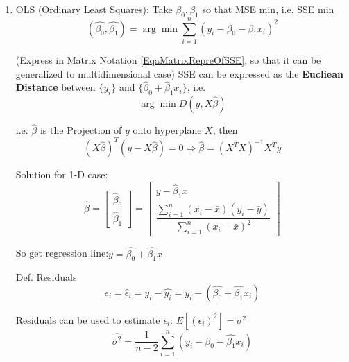    \begin{enumerate}
        \item OLS (Ordinary Least Squares): Take $\beta_0,\beta_1$ so that MSE min, i.e. SSE min
        \begin{equation}
            (\hat{\beta_0},\hat{\beta_1})=\arg\min\sum_{i=1}^n(y_i-\beta_0-\beta_1 x_i)^2    
        \end{equation}

        (Express in Matrix Notation \autoref{EqaMatrixRepreOfSSE}, so that it can be generalized to multidimensional case) SSE can be expressed as the \textbf{Eucliean Distance }between $ \{y_i\} $ and $ \{\hat{\beta}_0+\hat{\beta}_1x_i\}  $, i.e.
        \begin{equation}
            \arg\min D(y
            ,X \hat{\beta})
        \end{equation}

         i.e. $ \hat{\beta} $ is the Projection of $y $ onto hyperplane $ X $, then
         \begin{equation}
            ( X\hat{\beta} )^T(y- X\hat{\beta})=0 \Rightarrow \hat{\beta}=(X^TX)^{-1}X^Ty 
         \end{equation}
        

        Solution for 1-D case:
        \begin{equation}
            \hat{\beta}=\begin{bmatrix}
                \hat{\beta}_0\\ \hat{\beta}_1
            \end{bmatrix}
            =
            \begin{bmatrix}
            \bar{y}- \hat{\beta}_1\bar{x}\\
            \dfrac{\sum\limits_{i=1}^n(x_i-\bar{x})(y_i-\bar{y})}{\sum\limits_{i=1}^n(x_i-\bar{x})^2}
            \end{bmatrix}
        \end{equation}


        So get regression line:$y=\hat{\beta_0}+\hat{\beta_1}x$

        Def. Residuals
        \begin{equation}e_i=\hat{\epsilon}_i=y_i-\hat{y_i}=y_i-(\hat{\beta_0}+\hat{\beta_1}x_i)\end{equation}


        Residuals can be used to estimate $\epsilon_i$: $E[(\epsilon_i)^2]=\sigma^2$
        \begin{equation}\hat{\sigma^2}=\frac{1}{n-2}\sum_{i=1}^n(y_i-\hat{\beta_0}-\hat{\beta_1}x_i)\end{equation}


\end{enumerate}
